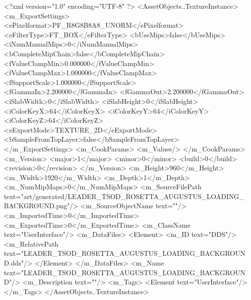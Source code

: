 <?xml version="1.0" encoding="UTF-8" ?>
<AssetObjects..TextureInstance>
	<m_ExportSettings>
		<ePixelformat>PF_R8G8B8A8_UNORM</ePixelformat>
		<eFilterType>FT_BOX</eFilterType>
		<bUseMips>false</bUseMips>
		<iNumManualMips>0</iNumManualMips>
		<bCompleteMipChain>false</bCompleteMipChain>
		<fValueClampMin>0.000000</fValueClampMin>
		<fValueClampMax>1.000000</fValueClampMax>
		<fSupportScale>1.000000</fSupportScale>
		<fGammaIn>2.200000</fGammaIn>
		<fGammaOut>2.200000</fGammaOut>
		<iSlabWidth>0</iSlabWidth>
		<iSlabHeight>0</iSlabHeight>
		<iColorKeyX>64</iColorKeyX>
		<iColorKeyY>64</iColorKeyY>
		<iColorKeyZ>64</iColorKeyZ>
		<eExportMode>TEXTURE_2D</eExportMode>
		<bSampleFromTopLayer>false</bSampleFromTopLayer>
	</m_ExportSettings>
	<m_CookParams>
		<m_Values/>
	</m_CookParams>
	<m_Version>
		<major>1</major>
		<minor>0</minor>
		<build>0</build>
		<revision>0</revision>
	</m_Version>
	<m_Height>960</m_Height>
	<m_Width>1920</m_Width>
	<m_Depth>1</m_Depth>
	<m_NumMipMaps>0</m_NumMipMaps>
	<m_SourceFilePath text="art/generated/LEADER_TSOD_ROSETTA_AUGUSTUS_LOADING_BACKGROUND.png"/>
	<m_SourceObjectName text=""/>
	<m_ImportedTime>0</m_ImportedTime>
	<m_ExportedTime>0</m_ExportedTime>
	<m_ClassName text="UserInterface"/>
	<m_DataFiles>
		<Element>
			<m_ID text="DDS"/>
			<m_RelativePath text="LEADER_TSOD_ROSETTA_AUGUSTUS_LOADING_BACKGROUND.dds"/>
		</Element>
	</m_DataFiles>
	<m_Name text="LEADER_TSOD_ROSETTA_AUGUSTUS_LOADING_BACKGROUND"/>
	<m_Description text=""/>
	<m_Tags>
		<Element text="UserInterface"/>
	</m_Tags>
</AssetObjects..TextureInstance>
